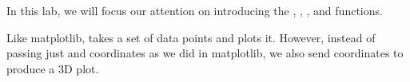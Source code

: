 In this lab, we will focus our attention on introducing the , , , and  functions.


Like matplotlib,  takes a set of data points and plots it.
However, instead of passing just  and  coordinates as we did in matplotlib, we also send  coordinates to produce a 3D plot.

